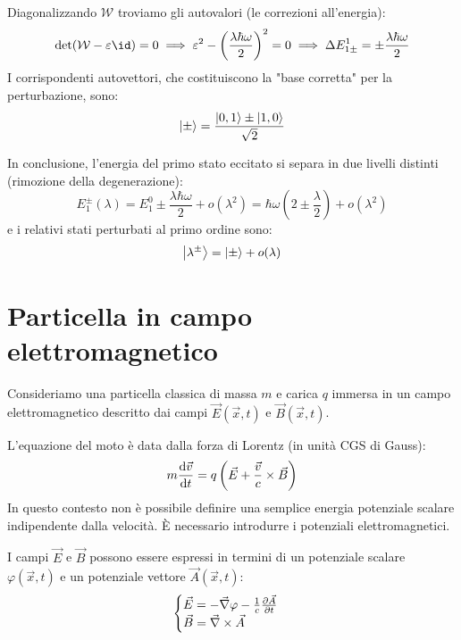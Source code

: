 Diagonalizzando $\mathcal{W}$ troviamo gli autovalori (le correzioni all'energia):
\[
    \det(\mathcal{W} - \varepsilon \id) = 0 \implies \varepsilon^2 - \left(\frac{\lambda\hbar\omega}{2}\right)^2 = 0 \implies \Delta E_{1\pm}^1 = \pm \frac{\lambda \hbar \omega}{2}
\]
I corrispondenti autovettori, che costituiscono la "base corretta" per la perturbazione, sono:
\[
    \ket{\pm} = \frac{\ket{0,1} \pm \ket{1,0}}{\sqrt{2}}
\]

In conclusione, l'energia del primo stato eccitato si separa in due livelli distinti (rimozione della degenerazione):
\begin{equation}
    E_1^{\pm}(\lambda) = E_1^0 \pm \frac{\lambda \hbar \omega}{2} + o(\lambda^2) = \hbar\omega \left( 2 \pm \frac{\lambda}{2} \right) + o(\lambda^2)
\end{equation}
e i relativi stati perturbati al primo ordine sono:
\begin{equation}
    \ket{\lambda^{\pm}} = \ket{\pm} + o(\lambda)
\end{equation}



\section{Particella in campo elettromagnetico}

Consideriamo una particella classica di massa \( m \) e carica \( q \) immersa in un campo elettromagnetico descritto dai campi \( \vec{E}(\vec{x},t) \) e \( \vec{B}(\vec{x},t) \).

L'equazione del moto è data dalla forza di Lorentz (in unità CGS di Gauss):
\begin{equation}
    m \dv{\vec{v}}{t} = q \left( \vec{E} + \frac{\vec{v}}{c} \times \vec{B} \right)
\end{equation}
In questo contesto non è possibile definire una semplice energia potenziale scalare indipendente dalla velocità. È necessario introdurre i potenziali elettromagnetici.

I campi \( \vec{E} \) e \( \vec{B} \) possono essere espressi in termini di un potenziale scalare \( \varphi(\vec{x},t) \) e un potenziale vettore \( \vec{A}(\vec{x},t) \):
\begin{equation}
    \begin{cases}
            \vec{E} = - \vec{\nabla}\varphi - \frac{1}{c} \pdv{\vec{A}}{t} \\
            \vec{B} = \vec{\nabla} \times \vec{A}
        \end{cases}
\end{equation}

